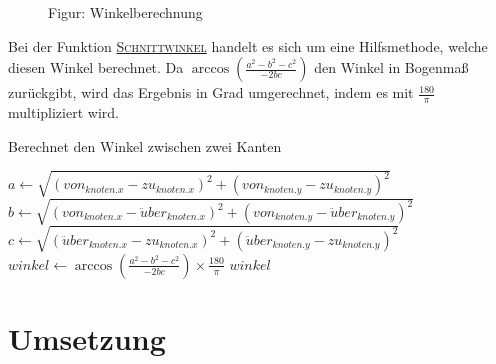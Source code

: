 \documentclass[a4paper,10pt,ngerman]{scrartcl}
\begin{document}
    \begin{figure}[H]
        \centering
        \caption{Figur: Winkelberechnung}\label{fig:figure2}
    \end{figure}

    Bei der Funktion \hyperref[alg:pseudo_crossangle]{\textsc{Schnittwinkel}} handelt es sich um eine Hilfsmethode, welche diesen Winkel berechnet.
    Da $\arccos\left(\frac{a^2 - b^2 - c^2}{-2bc}\right)$ den Winkel in Bogenmaß zurückgibt,
    wird das Ergebnis in Grad umgerechnet, indem es mit $\frac{180}{\pi}$ multipliziert wird.


    \begin{algorithm}[H]
        \caption{Berechnet den Winkel zwischen zwei Kanten}
        \begin{algorithmic}
                \State $\textit{a}\gets \sqrt{(von_{knoten.x} - zu_{knoten.x})^2 + (von_{knoten.y} - zu_{knoten.y})^2}$
                \State $\textit{b}\gets \sqrt{(von_{knoten.x} - \ddot uber_{knoten.x})^2 + (von_{knoten.y} - \ddot uber_{knoten.y})^2}$
                \State $\textit{c}\gets \sqrt{(\ddot uber_{knoten.x} - zu_{knoten.x})^2 + (\ddot uber_{knoten.y} - zu_{knoten.y})^2}$
                \State $\textit{winkel} \gets \arccos\left(\frac{a^2 - b^2 - c^2}{-2bc}\right) \times \frac{180}{\pi}$
                \State \Return $winkel$
            \EndFunction
        \end{algorithmic}\label{alg:pseudo_crossangle}
    \end{algorithm}

    \section{Umsetzung}\label{sec:umsetzung}
\end{document}
